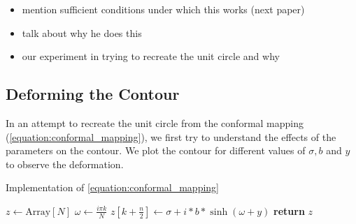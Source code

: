 \documentclass[a4paper]{report}
\begin{document}

\begin{itemize}
    \item mention sufficient conditions under which this works (next paper)
    \item talk about why he does this
    \item our experiment in trying to recreate the unit circle and why
\end{itemize}

\subsection{Deforming the Contour}\label{section:deforming_contour}
In an attempt to recreate the unit circle from the conformal mapping (\autoref{equation:conformal_mapping}), we first try to understand the effects of the parameters on the contour.  We plot the contour for different values of $\sigma, b$ and $y$ to observe the deformation.

\begin{algorithm}[H]
\caption{Implementation of \autoref{equation:conformal_mapping}}
\label{algo:hyperbolic_sine}
\begin{algorithmic}[1]
    \State $z \gets \text{Array}[N]$ 
        \State $\omega \gets \frac{i\pi  k}{N}$
        \State $z[k + \frac{n}{2}] \gets \sigma + i * b * \sinh(\omega + y)$
    \EndFor
    \State \textbf{return} $z$
\EndProcedure
\end{algorithmic}
\end{algorithm}
\end{document}
